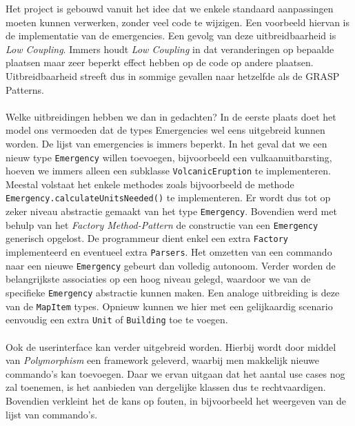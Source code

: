 \label{uitbreidbaarheid}
Het project is gebouwd vanuit het idee dat we enkele standaard aanpassingen moeten kunnen verwerken, zonder veel code te wijzigen. Een voorbeeld hiervan is de implementatie van de emergencies. Een gevolg van deze uitbreidbaarheid is \textit{Low Coupling}. Immers houdt \textit{Low Coupling} in dat veranderingen op bepaalde plaatsen maar zeer beperkt effect hebben op de code op andere plaatsen. Uitbreidbaarheid streeft dus in sommige gevallen naar hetzelfde als de GRASP Patterns.
\paragraph{}
Welke uitbreidingen hebben we dan in gedachten? In de eerste plaats doet het model ons vermoeden dat de types Emergencies wel eens uitgebreid kunnen worden. De lijst van emergencies is immers beperkt. In het geval dat we een nieuw type \texttt{Emergency} willen toevoegen, bijvoorbeeld een vulkaanuitbarsting, hoeven we immers alleen een subklasse \texttt{VolcanicEruption} te implementeren. Meestal volstaat het enkele methodes zoals bijvoorbeeld de methode \texttt{Emergency.calculateUnitsNeeded()} te implementeren. Er wordt dus tot op zeker niveau abstractie gemaakt van het type \texttt{Emergency}. Bovendien werd met behulp van het \textit{Factory Method-Pattern} de constructie van een \verb+Emergency+ generisch opgelost. De programmeur dient enkel een extra \verb+Factory+ implementeerd en eventueel extra \verb+Parsers+. Het omzetten van een commando naar een nieuwe \verb+Emergency+ gebeurt dan volledig autonoom. Verder worden de belangrijkste associaties op een hoog niveau gelegd, waardoor we van de specifieke \verb+Emergency+ abstractie kunnen maken. Een analoge uitbreiding is deze van de \texttt{MapItem} types. Opnieuw kunnen we hier met een gelijkaardig scenario eenvoudig een extra \texttt{Unit} of \texttt{Building} toe te voegen.
\paragraph{}
Ook de userinterface kan verder uitgebreid worden. Hierbij wordt door middel van \textit{Polymorphism} een framework geleverd, waarbij men makkelijk nieuwe commando's kan toevoegen. Daar we ervan uitgaan dat het aantal use cases nog zal toenemen, is het aanbieden van dergelijke klassen dus te rechtvaardigen. Bovendien verkleint het de kans op fouten, in bijvoorbeeld het weergeven van de lijst van commando's.
